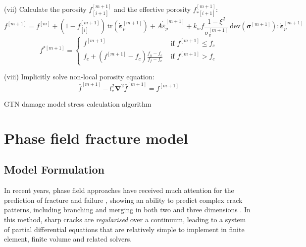 \documentclass[sn-mathphys,Numbered,draft]{sn-jnl}%
\newcommand{\bb}{\boldsymbol}
\begin{document}
\begin{algorithm}[htbp]
(vii) Calculate the porosity $f_{[i+1]}^{[m+1]}$ and the effective porosity $f_{*[i+1]}^{[m+1]}$:
\begin{equation}
	f^{[m+1]} = f^{[m]} + \left(1 - f^{[m+1]}_{[i]}\right) \, \text{tr}\left(\dot{\boldsymbol{\varepsilon}}^{[m+1]}_p\right)
	+ A \dot{\bar{\varepsilon}}^{[m+1]}_p
	+ k_w f\frac{1 - \xi^2 }{\sigma_v^{[m+1]}} \,\text{dev}(\bb{\sigma}^{[m+1]}):{\dot{\boldsymbol{\varepsilon}}}_p^{[m+1]}
\end{equation}
\begin{equation}
	f^{*[m+1]} =
	\left\{
	\begin{array}{cc}
		f^{[m+1]}  & \text { if } f^{[m+1]}  \leq f_c \\
		f_c + \left(f^{[m+1]} - f_c\right) \frac{f_u - f_c}{f_f - f_c} & \text { if } f^{[m+1]}  > f_c
	\end{array}\right.
\end{equation}


(viii) Implicitly solve non-local porosity equation:
\begin{equation}
	\bar{f}^{[m+1]} -  l_c^2 \bb{\nabla}^2 \bar{f}^{[m+1]} = f^{[m+1]}
\end{equation}

\caption{GTN damage model stress calculation algorithm}
\end{algorithm}






\section{Phase field fracture model}

\subsection{Model Formulation}
In recent years, phase field approaches have received much attention for the prediction of fracture and failure \cite{borden_phase-field_2012, miehe_phase_2010, ambati_phase-field_2015, borden_phase-field_2016, miehe_phase_2016, dittmann_variational_2018, samaniego_phase-field_2021}, showing an ability to predict complex crack patterns, including branching and merging in both two and three dimensions \cite{borden_phase-field_2012, miehe_phase_2010}.
In this method, sharp cracks are \emph{regularised} over a continuum, leading to a system of partial differential equations that are relatively simple to implement in finite element, finite volume and related solvers.
\end{document}
